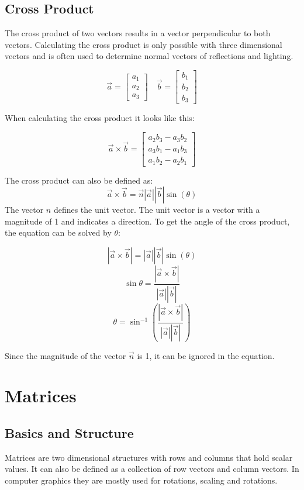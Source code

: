 \subsection{Cross Product}
The cross product of two vectors results in a vector perpendicular to both vectors. Calculating the cross product is only possible with three dimensional vectors and is often used to determine normal vectors of reflections and lighting.\ \cite{Web:15}

\[
\vec{a} = \begin{bmatrix}
a_{1}\\
a_{2}\\
a_{3}
\end{bmatrix}
\quad
\vec{b} = \begin{bmatrix}
b_{1}\\
b_{2}\\
b_{3}
\end{bmatrix}
\]

When calculating the cross product it looks like this:

\[
\vec{a} \times \vec{b} = 
\begin{bmatrix} 
a_{2} b_{3} - a_{3} b_{2} \\
a_{3} b_{1} - a_{1} b_{3} \\
a_{1} b_{2} - a_{2} b_{1}
\end{bmatrix}
\]
\noindent\cite{Web:14}

The cross product can also be defined as:
\[\vec{a} \times \vec{b} = \vec{n} \left| \vec{a} \right| \left| \vec{b} \right| \sin(\theta) \]
The vector $n$ defines the unit vector. The unit vector is a vector with a magnitude of 1 and indicates a direction. To get the angle of the cross product, the equation can be solved by $\theta$:

\[\left| \vec{a} \times \vec{b} \right| = \left| \vec{a} \right| \left| \vec{b} \right| \sin(\theta)\]
\[
\sin\theta = \frac{\left| \vec{a} \times \vec{b} \right| }{\left| \vec{a} \right|  \left| \vec{b} \right|}
\]
\[
\theta = \sin^{-1}(\frac{\left| \vec{a} \times \vec{b} \right| }{\left| \vec{a} \right|  \left| \vec{b} \right|})
\]

Since the magnitude of the vector $\vec{n}$ is 1, it can be ignored in the equation.\ \cite{Web:12}


\section{Matrices}

\subsection{Basics and Structure}
Matrices are two dimensional structures with rows and columns that hold scalar values. It can also be defined as a collection of row vectors and column vectors. In computer graphics they are mostly used for rotations, scaling and rotations.\ \cite{Web:17}


